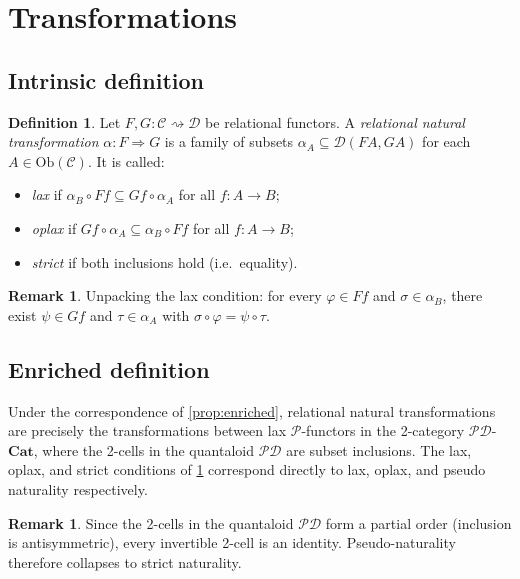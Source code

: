 \documentclass{article}
\theoremstyle{plain}
\theoremstyle{definition}
\newtheorem{definition}[theorem]{Definition}
\newtheorem{remark}[theorem]{Remark}
\newcommand{\Ob}{\mathrm{Ob}}
\newcommand{\Cat}{\mathbf{Cat}}
\newcommand{\cP}{\mathcal{P}}
\newcommand{\cC}{\mathcal{C}}
\newcommand{\cD}{\mathcal{D}}
\begin{document}
\section{Transformations}\label{sec:trans}

\subsection{Intrinsic definition}

\begin{definition}\label{def:reltrans}
Let $F, G\colon \cC \rightsquigarrow \cD$ be relational functors.  A \emph{relational natural transformation} $\alpha\colon F \Rightarrow G$ is a family of subsets $\alpha_A \subseteq \cD(FA, GA)$ for each $A \in \Ob(\cC)$.  It is called:
\begin{itemize}[leftmargin=2em]
    \item \emph{lax} if $\alpha_B \circ Ff \subseteq Gf \circ \alpha_A$ for all $f\colon A \to B$;
    \item \emph{oplax} if $Gf \circ \alpha_A \subseteq \alpha_B \circ Ff$ for all $f\colon A \to B$;
    \item \emph{strict} if both inclusions hold (i.e.\ equality).
\end{itemize}
\end{definition}

\begin{remark}\label{rmk:laxunpack}
Unpacking the lax condition: for every $\varphi \in Ff$ and $\sigma \in \alpha_B$, there exist $\psi \in Gf$ and $\tau \in \alpha_A$ with $\sigma \circ \varphi = \psi \circ \tau$.
\end{remark}

\subsection{Enriched definition}

Under the correspondence of \cref{prop:enriched}, relational natural transformations are precisely the transformations between lax $\cP$-functors in the 2-category $\cP\cD$-$\Cat$, where the 2-cells in the quantaloid $\cP\cD$ are subset inclusions.  The lax, oplax, and strict conditions of \cref{def:reltrans} correspond directly to lax, oplax, and pseudo naturality respectively.

\begin{remark}\label{rmk:pseudo}
Since the 2-cells in the quantaloid $\cP\cD$ form a partial order (inclusion is antisymmetric), every invertible 2-cell is an identity.  Pseudo-naturality therefore collapses to strict naturality.
\end{remark}
\end{document}
